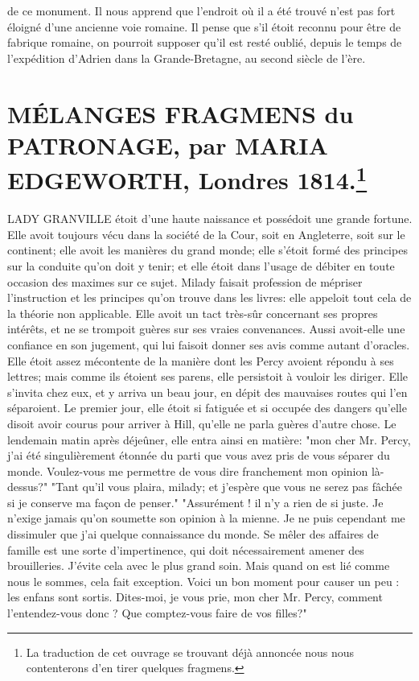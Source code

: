 \setcounter{page}{383} de ce monument. Il nous apprend que l'endroit où il a été trouvé n'est pas fort éloigné d'une ancienne voie romaine. Il pense que s'il étoit reconnu pour être de fabrique romaine, on pourroit supposer qu'il est resté oublié, depuis le temps de l'expédition d'Adrien dans la Grande-Bretagne, au second siècle de l'ère.
\section{MÉLANGES \large{FRAGMENS du PATRONAGE, par MARIA EDGEWORTH, Londres 1814.\footnote{La traduction de cet ouvrage se trouvant déjà annoncée nous nous contenterons d'en tirer quelques fragmens.}}}
LADY GRANVILLE étoit d'une haute naissance et possédoit une grande fortune. Elle avoit toujours vécu dans la société de la Cour, soit en Angleterre, soit sur le continent; elle avoit les manières du grand monde; elle s'étoit formé des principes sur la conduite qu'on doit y tenir; et elle étoit dans l'usage de débiter\setcounter{page}{384} en toute occasion des maximes sur ce sujet.
Milady faisait profession de mépriser l'instruction et les principes qu'on trouve dans les livres: elle appeloit tout cela de la théorie non applicable. Elle avoit un tact très-sûr concernant ses propres intérêts, et ne se trompoit guères sur ses vraies convenances. Aussi avoit-elle une confiance en son jugement, qui lui faisoit donner ses avis comme autant d'oracles.
Elle étoit assez mécontente de la manière dont les Percy avoient répondu à ses lettres; mais comme ils étoient ses parens, elle persistoit à vouloir les diriger. Elle s'invita chez eux, et y arriva un beau jour, en dépit des mauvaises routes qui l'en séparoient. Le premier jour, elle étoit si fatiguée et si occupée des dangers qu'elle disoit avoir courus pour arriver à Hill, qu'elle ne parla guères d'autre chose. Le lendemain matin après déjeûner, elle entra ainsi en matière: "mon cher Mr. Percy, j'ai été singulièrement étonnée du parti que vous avez pris de vous séparer du monde. Voulez-vous me permettre de vous dire franchement mon opinion là-dessus?"
"Tant qu'il vous plaira, milady; et j'espère que vous ne serez pas fâchée si je conserve ma façon de penser."\setcounter{page}{385} "Assurément ! il n'y a rien de si juste. Je n'exige jamais qu'on soumette son opinion à la mienne. Je ne puis cependant me dissimuler que j'ai quelque connaissance du monde. Se mêler des affaires de famille est une sorte d'impertinence, qui doit nécessairement amener des brouilleries. J'évite cela avec le plus grand soin. Mais quand on est lié comme nous le sommes, cela fait exception. Voici un bon moment pour causer un peu : les enfans sont sortis. Dites-moi, je vous prie, mon cher Mr. Percy, comment l'entendez-vous donc ? Que comptez-vous faire de vos filles?"
